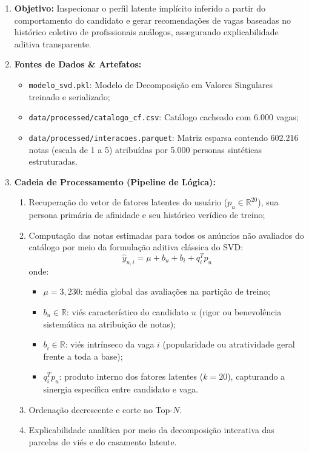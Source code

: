 \begin{enumerate}[label=\textbf{\arabic*.}]
    \item \textbf{Objetivo:} Inspecionar o perfil latente implícito inferido a partir do comportamento do candidato e gerar recomendações de vagas baseadas no histórico coletivo de profissionais análogos, assegurando explicabilidade aditiva transparente.
    \item \textbf{Fontes de Dados \& Artefatos:}
    \begin{itemize}
        \item \texttt{modelo\_svd.pkl}: Modelo de Decomposição em Valores Singulares treinado e serializado;
        \item \texttt{data/processed/catalogo\_cf.csv}: Catálogo cacheado com 6.000 vagas;
        \item \texttt{data/processed/interacoes.parquet}: Matriz esparsa contendo 602.216 notas (escala de 1 a 5) atribuídas por 5.000 personas sintéticas estruturadas.
    \end{itemize}
    \item \textbf{Cadeia de Processamento (Pipeline de Lógica):}
    \begin{enumerate}[label=\alph*)]
        \item Recuperação do vetor de fatores latentes do usuário ($p_u \in \mathbb{R}^{20}$), sua persona primária de afinidade e seu histórico verídico de treino;
        \item Computação das notas estimadas para todos os anúncios não avaliados do catálogo por meio da formulação aditiva clássica do SVD:
        \begin{equation}
            \hat{y}_{u,i} = \mu + b_u + b_i + q_i^T p_u
        \end{equation}
        onde:
        \begin{itemize}
            \item $\mu = 3{,}230$: média global das avaliações na partição de treino;
            \item $b_u \in \mathbb{R}$: viés característico do candidato $u$ (rigor ou benevolência sistemática na atribuição de notas);
            \item $b_i \in \mathbb{R}$: viés intrínseco da vaga $i$ (popularidade ou atratividade geral frente a toda a base);
            \item $q_i^T p_u$: produto interno dos fatores latentes ($k=20$), capturando a sinergia específica entre candidato e vaga.
        \end{itemize}
        \item Ordenação decrescente e corte no Top-$N$.
        \item Explicabilidade analítica por meio da decomposição interativa das parcelas de viés e do casamento latente.
    \end{enumerate}
\end{enumerate}

